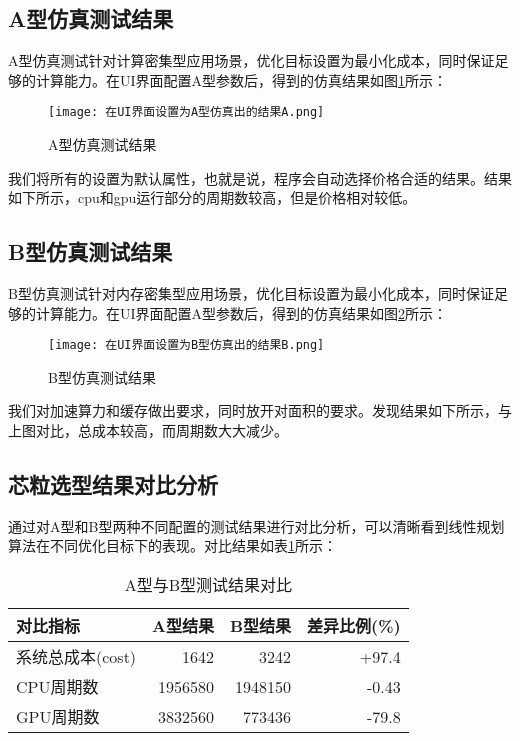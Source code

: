 \documentclass[bachelor]{thesis-uestc}
\begin{document}
\subsection{A型仿真测试结果}

A型仿真测试针对计算密集型应用场景，优化目标设置为最小化成本，同时保证足够的计算能力。在UI界面配置A型参数后，得到的仿真结果如图\ref{fig:result_a}所示：

\begin{figure}[htbp]
    \centering
    \texttt{[image: 在UI界面设置为A型仿真出的结果A.png]}
    \caption{A型仿真测试结果}
    \label{fig:result_a}
\end{figure}


我们将所有的设置为默认属性，也就是说，程序会自动选择价格合适的结果。结果如下所示，cpu和gpu运行部分的周期数较高，但是价格相对较低。

\subsection{B型仿真测试结果}

B型仿真测试针对内存密集型应用场景，优化目标设置为最小化成本，同时保证足够的计算能力。在UI界面配置A型参数后，得到的仿真结果如图\ref{fig:result_b}所示：

\begin{figure}[htbp]
    \centering
    \texttt{[image: 在UI界面设置为B型仿真出的结果B.png]}
    \caption{B型仿真测试结果}
    \label{fig:result_b}
\end{figure}


我们对加速算力和缓存做出要求，同时放开对面积的要求。发现结果如下所示，与上图对比，总成本较高，而周期数大大减少。

\subsection{芯粒选型结果对比分析}

通过对A型和B型两种不同配置的测试结果进行对比分析，可以清晰看到线性规划算法在不同优化目标下的表现。对比结果如表\ref{tab:comparison_results}所示：

\begin{table}[htbp]
\caption{A型与B型测试结果对比}
\centering
\begin{tabular}{|l|r|r|r|}
\hline
\textbf{对比指标} & \textbf{A型结果} & \textbf{B型结果} & \textbf{差异比例(\%)} \\
\hline
系统总成本(cost) & 1642 & 3242 & +97.4 \\
\hline
CPU周期数 & 1956580 & 1948150 & -0.43 \\
\hline
GPU周期数 & 3832560 & 773436 & -79.8 \\
\hline
\end{tabular}
\label{tab:comparison_results}
\end{table}
\end{document}
